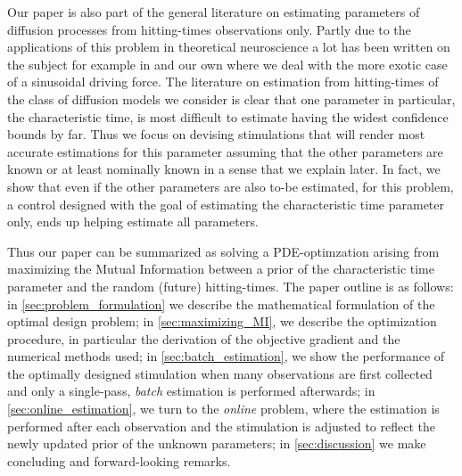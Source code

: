 \documentclass{article}
\begin{document}
Our paper is also part of the general literature on estimating parameters of
diffusion processes from hitting-times observations only. Partly due to the
applications of this problem in theoretical neuroscience a lot has been written
on the subject for example in
\cite{Ditlevsen2007,MullowneyIyengar2008,Alili2005} and our own \cite{Iolov2013}
where we deal with the more exotic case of a sinusoidal driving force. The
literature on estimation from hitting-times of the class of diffusion models we
consider is clear that one parameter in particular, the characteristic time, is
most difficult to estimate having the widest confidence bounds by far. Thus we
focus on devising stimulations that will render most accurate estimations for
this parameter assuming that the other parameters are known or at least
nominally known in a sense that we explain later. In fact, we show that even if
the other parameters are also to-be estimated, for this problem, a control
designed with the goal of estimating the characteristic time parameter only,
ends up helping estimate all parameters.  

Thus our paper can be summarized as solving a PDE-optimzation arising from
maximizing the Mutual Information between a prior of the characteristic time
parameter and the random (future) hitting-times. The paper outline is as
follows: in \cref{sec:problem_formulation} we describe the mathematical formulation of the optimal design problem; in
\cref{sec:maximizing_MI}, we describe the optimization procedure, in particular
the derivation of the objective gradient and the numerical methods used; in
\cref{sec:batch_estimation}, we show the performance of the optimally designed
stimulation when many observations are first collected and only a single-pass,
{\sl batch} estimation is performed afterwards; in \cref{sec:online_estimation},
we turn to the {\sl online} problem, where the estimation is performed
after each observation and the stimulation is adjusted to reflect the newly
updated prior of the unknown parameters; in \cref{sec:discussion} we make
concluding and forward-looking remarks.

 
\end{document}
